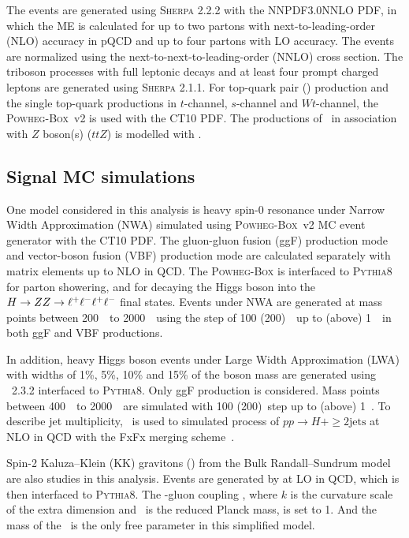 The \Zjet events are generated using \textsc{Sherpa} 2.2.2 with the NNPDF3.0NNLO PDF,
in which the ME is calculated for up to two partons with next-to-leading-order (NLO) accuracy in pQCD and up to four partons with LO accuracy.
The \Zjet events are normalized using the next-to-next-to-leading-order (NNLO) cross section.
The triboson processes with full leptonic decays and at least four prompt charged leptons are generated using \textsc{Sherpa} 2.1.1.
For top-quark pair (\ttbar) production and the single top-quark productions in $t$-channel, $s$-channel and $Wt$-channel, the \textsc{Powheg-Box}~v2 is used with the CT10 PDF.
The productions of \ttbar~in association with $Z$ boson(s) ($ttZ$) is modelled with \MGMCatNLO.

\subsection{Signal MC simulations}
\label{sec:hmhzz_signal_mc}

One model considered in this analysis is heavy spin-0 resonance under Narrow Width Approximation (NWA) simulated using \textsc{Powheg-Box}~v2 MC event generator with the CT10 PDF.
The gluon-gluon fusion (ggF) production mode and vector-boson fusion (VBF) production mode are calculated separately with matrix elements up to NLO in QCD.
The \textsc{Powheg-Box} is interfaced to \textsc{Pythia8} for parton showering, and for decaying the Higgs boson into the $H \rightarrow ZZ \rightarrow \ell^+\ell^-\ell^+\ell^-$ final states.
Events under NWA are generated at mass points between 200~\gev~to 2000~\gev~using the step of 100 (200)~\gev~up to (above) 1~\tev~in both ggF and VBF productions.

In addition, heavy Higgs boson events under Large Width Approximation (LWA) with widths of 1\%, 5\%, 10\% and 15\% of the boson mass are generated using \MGMCatNLO~2.3.2 interfaced to \textsc{Pythia8}.
Only ggF production is considered.
Mass points between 400~\gev~to 2000~\gev~are simulated with 100 (200)~\gev step up to (above) 1~\tev.
To describe jet multiplicity, \MGMCatNLO~is used to simulated process of $pp\to H + \geq2\text{jets}$ at NLO in QCD with the FxFx merging scheme~\cite{Frederix2012}.

Spin-2 Kaluza–Klein (KK) gravitons (\Graviton) from the Bulk Randall–Sundrum model~\cite{graviton} are also studies in this analysis.
Events are generated by \MGMCatNLO at LO in QCD, which is then interfaced to \textsc{Pythia8}.
The \Graviton-gluon coupling \kOverMpl, where $k$ is the curvature scale of the extra dimension and \Mpl~is the reduced Planck mass, is set to 1.
And the mass of the \Graviton~is the only free parameter in this simplified model.
